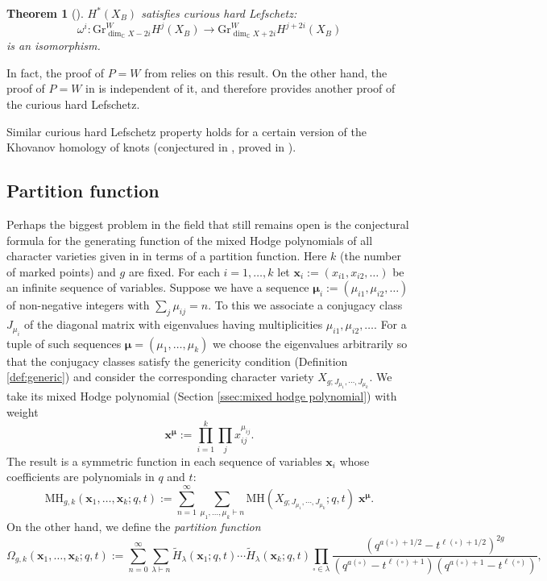 \documentclass[12pt]{amsart}
\newtheorem{theorem}{Theorem}[section]
\theoremstyle{definition}
\theoremstyle{remark}
\numberwithin{equation}{section}
\newcommand{\BC}{\mathbb C}
\begin{document}
	\begin{theorem}[\cite{mellit2019cell}]
		$H^*(X_B)$ satisfies curious hard Lefschetz:
		\[
		\omega^i: \mathrm{Gr}^W_{\dim_\BC X-2i} H^j(X_B) \to \mathrm{Gr}^W_{\dim_\BC X+2i} H^{j+2 i}(X_B)
		\]
		is an isomorphism.
	\end{theorem}
	
	In fact, the proof of $P=W$ from \cite{maulik2024pw} relies on this result. On the other hand, the proof of $P=W$ in \cite{hausel2022p} is independent of it, and therefore provides another proof of the curious hard Lefschetz.
	
	Similar curious hard Lefschetz property holds for a certain version of the Khovanov homology of knots (conjectured in \cite{dunfield2006superpolynomial}, proved in \cite{gorsky2024tautological}).
	
	\subsection{Partition function} Perhaps the biggest problem in the field that still remains open is the conjectural formula for the generating function of the mixed Hodge polynomials of all character varieties given in \cite{hausel2011arithmetic} in terms of a partition function. Here $k$ (the number of marked points) and $g$ are fixed. For each $i=1,\ldots,k$ let $\mathbf{x}_i:=(x_{i1},x_{i2},\ldots)$ be an infinite sequence of variables. Suppose we have a sequence $\boldsymbol\mu_i:=(\mu_{i1},\mu_{i2},\ldots)$ of non-negative integers with $\sum_{j}\mu_{ij}=n$. To this we associate a conjugacy class $J_{\mu_i}$ of the diagonal matrix with eigenvalues having multiplicities $\mu_{i1},\mu_{i2},\ldots$. For a tuple of such sequences $\boldsymbol{\mu}=(\mu_1,\ldots,\mu_k)$ we choose the eigenvalues arbitrarily so that the conjugacy classes satisfy the genericity condition (Definition \ref{def:generic}) and consider the corresponding character variety $X_{g;J_{\mu_1},\cdots,J_{\mu_{k}}}$. We take its mixed Hodge polynomial (Section \ref{ssec:mixed hodge polynomial}) with weight
	\[
	\mathbf{x}^{\boldsymbol\mu}:=\prod_{i=1}^k \prod_j x_{ij}^{\mu_{ij}}.
	\]
	The result is a symmetric function in each sequence of variables $\mathbf{x}_i$ whose coefficients are polynomials in $q$ and $t$:
	\[
	\mathrm{MH}_{g,k}(\mathbf{x}_1,\ldots,\mathbf{x}_k; q,t) :=
	\sum_{n=1}^\infty \sum_{ \mu_1, \dots, \mu_{k} \vdash n} \mathrm{MH}(X_{g;J_{\mu_1},\cdots,J_{\mu_{k}}};q,t) \; \mathbf{x}^{\boldsymbol\mu}.
	\]
	On the other hand, we define the \emph{partition function}
	\begin{equation}\label{eq:partition function}
		\Omega_{g,k}(\mathbf{x}_1,\ldots,\mathbf{x}_{k}; q,t) 
		:=\sum_{n=0}^\infty \sum_{\lambda\vdash n} \tilde H_\lambda(\mathbf{x}_1;q,t) \cdots \tilde H_\lambda(\mathbf{x}_k;q,t)
		\prod_{\square\in\lambda}\frac{\left(q^{a(\square)+1/2} - t^{\ell(\square)+1/2}\right)^{2g}}{(q^{a(\square)} - t^{\ell(\square)+1})(q^{a(\square)+1} - t^{\ell(\square)})},
	\end{equation}
\end{document}
